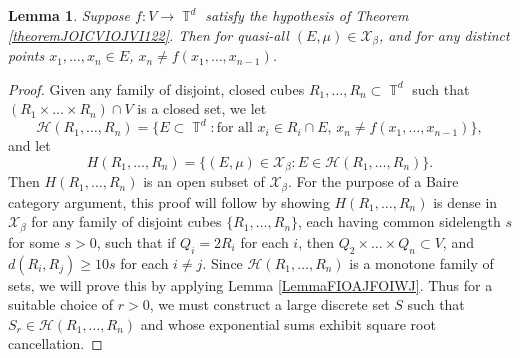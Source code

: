 \documentclass[dvipsnames,letterpaper,12pt]{article}
\numberwithin{equation}{section}
\DeclareMathOperator{\TT}{\mathbb{T}}
\newtheorem{lemma}[theorem]{Lemma}
\numberwithin{theorem}{section}
\begin{document}
\begin{lemma} \label{lemmaOIOICJOIJOISJOIJS}
    Suppose $f: V \to \TT^d$ satisfy the hypothesis of Theorem \ref{theoremJOICVIOJVI122}. Then for quasi-all $(E,\mu) \in \mathcal{X}_\beta$, and for any distinct points $x_1,\dots,x_n \in E$, $x_n \neq f(x_1,\dots,x_{n-1})$.
\end{lemma}
\begin{proof}
    Given any family of disjoint, closed cubes $R_1,\dots,R_n \subset \TT^d$ such that $(R_1 \times \dots \times R_n) \cap V$ is a closed set, we let
    \[ \mathcal{H}(R_1,\dots,R_n) = \{ E \subset \TT^d: \text{for all $x_i \in R_i \cap E$, $x_n \neq f(x_1,\dots,x_{n-1})$} \}, \]
    and let
    \[ H(R_1,\dots,R_n) = \{ (E,\mu) \in \mathcal{X}_\beta: E \in \mathcal{H}(R_1,\dots,R_n) \}. \]
    Then $H(R_1,\dots,R_n)$ is an open subset of $\mathcal{X}_\beta$. For the purpose of a Baire category argument, this proof will follow by showing $H(R_1,\dots,R_n)$ is dense in $\mathcal{X}_\beta$ for any family of disjoint cubes $\{ R_1,\dots, R_n \}$, each having common sidelength $s$ for some $s > 0$, such that if $Q_i = 2R_i$ for each $i$, then $Q_2 \times \dots \times Q_n \subset V$, and $d(R_i,R_j) \geq 10s$ for each $i \neq j$. Since $\mathcal{H}(R_1,\dots,R_n)$ is a monotone family of sets, we will prove this by applying Lemma \ref{LemmaFIOAJFOIWJ}. Thus for a suitable choice of $r > 0$, we must construct a large discrete set $S$ such that $S_r \in \mathcal{H}(R_1,\dots,R_n)$ and whose exponential sums exhibit square root cancellation.


\end{proof}
\end{document}
